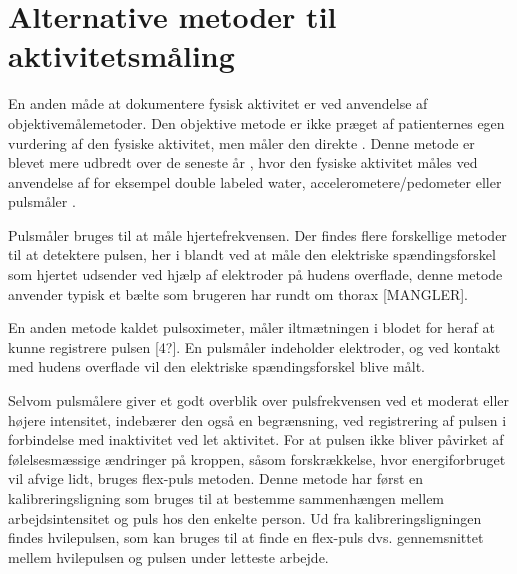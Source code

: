 \section{Alternative metoder til aktivitetsmåling}

En anden måde at dokumentere fysisk aktivitet er ved anvendelse af objektivemålemetoder.
Den objektive metode er ikke præget af patienternes egen vurdering af den fysiske aktivitet, men måler den direkte \cite{pedersen2011, adamo2009}. 
Denne metode er blevet mere udbredt over de seneste år \citep{pedersen2011}, hvor den fysiske aktivitet måles ved anvendelse af for eksempel double labeled water, accelerometere/pedometer eller pulsmåler \cite{pedersen2011, motionsraad2007, adamo}. 




Pulsmåler bruges til at måle hjertefrekvensen. 
Der findes flere forskellige metoder til at detektere pulsen, her i blandt ved at måle den elektriske spændingsforskel som hjertet udsender ved hjælp af elektroder på hudens overflade, denne metode anvender typisk et bælte som brugeren har rundt om thorax \cite{motionsraad2007} [MANGLER]. 


En anden metode kaldet pulsoximeter, måler iltmætningen i blodet for heraf at kunne registrere pulsen [4?]. 
En pulsmåler indeholder elektroder, og ved kontakt med hudens overflade vil den elektriske spændingsforskel blive målt. 

Selvom pulsmålere giver et godt overblik over pulsfrekvensen ved et moderat eller højere intensitet, indebærer den også en begrænsning, ved registrering af pulsen i forbindelse med inaktivitet ved let aktivitet. 
For at pulsen ikke bliver påvirket af følelsesmæssige ændringer på kroppen, såsom forskrækkelse, hvor energiforbruget vil afvige lidt,  bruges flex-puls metoden. 
Denne metode har først en kalibreringsligning som bruges til at bestemme sammenhængen mellem arbejdsintensitet og puls hos den enkelte person. 
Ud fra kalibreringsligningen findes hvilepulsen, som kan bruges til at finde en flex-puls dvs. gennemsnittet mellem hvilepulsen og pulsen under letteste arbejde. \cite{motionsraad2007}

